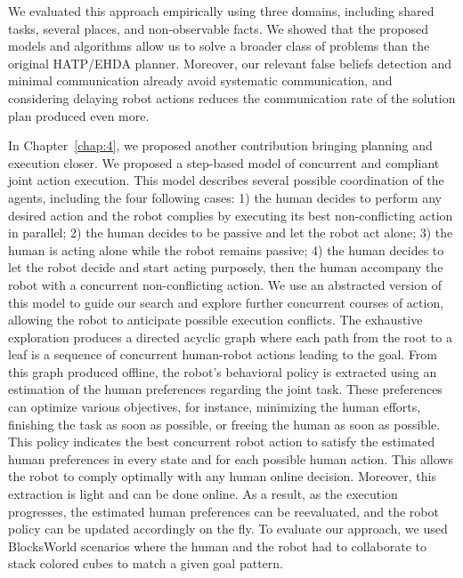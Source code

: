 We evaluated this approach empirically using three domains, including shared tasks, several places, and non-observable facts. We showed that the proposed models and algorithms allow us to solve a broader class of problems than the original HATP/EHDA planner. Moreover, our relevant false beliefs detection and minimal communication already avoid systematic communication, and considering delaying robot actions reduces the communication rate of the solution plan produced even more. 



In Chapter~\ref{chap:4}, we proposed another contribution bringing planning and execution closer. We proposed a step-based model of concurrent and compliant joint action execution. 
This model describes several possible coordination of the agents, including the four following cases: 1) the human decides to perform any desired action and the robot complies by executing its best non-conflicting action in parallel; 2) the human decides to be passive and let the robot act alone; 3) the human is acting alone while the robot remains passive; 4) the human decides to let the robot decide and start acting purposely, then the human accompany the robot with a concurrent non-conflicting action.
We use an abstracted version of this model to guide our search and explore further concurrent courses of action, allowing the robot to anticipate possible execution conflicts. 
The exhaustive exploration produces a directed acyclic graph where each path from the root to a leaf is a sequence of concurrent human-robot actions leading to the goal. From this graph produced offline, the robot's behavioral policy is extracted using an estimation of the human preferences regarding the joint task. These preferences can optimize various objectives, for instance, minimizing the human efforts, finishing the task as soon as possible, or freeing the human as soon as possible.  
This policy indicates the best concurrent robot action to satisfy the estimated human preferences in every state and for each possible human action. This allows the robot to comply optimally with any human online decision.  
Moreover, this extraction is light and can be done online. As a result, as the execution progresses, the estimated human preferences can be reevaluated, and the robot policy can be updated accordingly on the fly.
To evaluate our approach, we used BlocksWorld scenarios where the human and the robot had to collaborate to stack colored cubes to match a given goal pattern. 
